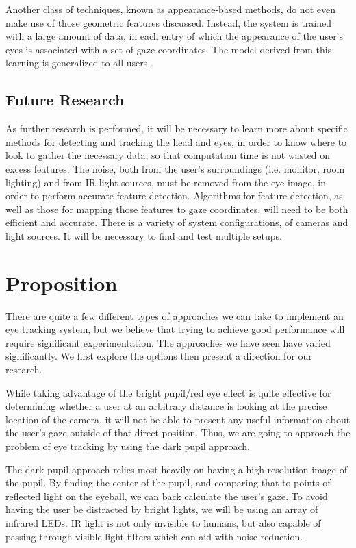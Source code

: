 \documentclass[12pt,conference,onecolumn]{IEEEtran}
\begin{document}
Another class of techniques, known as appearance-based methods, do not even make use of those geometric features discussed. Instead, the system is trained with a large amount of data, in each entry of which the appearance of the user's eyes is associated with a set of gaze coordinates. The model derived from this learning is generalized to all users \cite{morimoto}.
\subsection{Future Research}

As further research is performed, it will be necessary to learn more about specific methods for detecting and tracking the head and eyes, in order to know where to look to gather the necessary data, so that computation time is not wasted on excess features. The noise, both from the user's surroundings (i.e. monitor, room lighting) and from IR light sources, must be removed from the eye image, in order to perform accurate feature detection. Algorithms for feature detection, as well as those for mapping those features to gaze coordinates, will need to be both efficient and accurate. There is a variety of system configurations, of cameras and light sources. It will be necessary to find and test multiple setups. 
\section{Proposition} \label{sec:proposition}
There are quite a few different types of approaches we can take to implement an eye tracking system, but we believe that trying to achieve good performance will require significant experimentation. The approaches we have seen have varied significantly.  We first explore the options then present a direction for our research.

	While taking advantage of the bright pupil/red eye effect is quite effective for determining whether a user at an arbitrary distance is looking at the precise location of the camera, it will not be able to present any useful information  about the user’s gaze outside of that direct position.  Thus, we are going to approach the problem of eye tracking by using the dark pupil approach.
	
	The dark pupil approach relies most heavily on having a high resolution image of the pupil. By finding the center of the pupil, and comparing that to points of reflected light on the eyeball, we can back calculate the user’s gaze. To avoid having the user be distracted by bright lights, we will be using an array of infrared LEDs. IR light is not only invisible to humans, but also capable of passing through visible light filters which can aid with noise reduction. 
	
\end{document}
